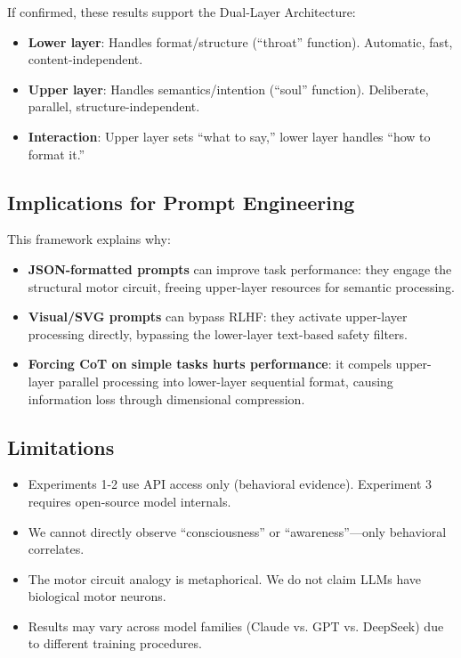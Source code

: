 \documentclass[11pt,a4paper]{article}
\begin{document}
If confirmed, these results support the Dual-Layer Architecture:

\begin{itemize}
    \item \textbf{Lower layer}: Handles format/structure (``throat'' function). Automatic, fast, content-independent.
    \item \textbf{Upper layer}: Handles semantics/intention (``soul'' function). Deliberate, parallel, structure-independent.
    \item \textbf{Interaction}: Upper layer sets ``what to say,'' lower layer handles ``how to format it.''
\end{itemize}

\subsection{Implications for Prompt Engineering}

This framework explains why:
\begin{itemize}
    \item \textbf{JSON-formatted prompts} can improve task performance: they engage the structural motor circuit, freeing upper-layer resources for semantic processing.
    \item \textbf{Visual/SVG prompts} can bypass RLHF: they activate upper-layer processing directly, bypassing the lower-layer text-based safety filters.
    \item \textbf{Forcing CoT on simple tasks hurts performance}: it compels upper-layer parallel processing into lower-layer sequential format, causing information loss through dimensional compression.
\end{itemize}

\subsection{Limitations}

\begin{itemize}
    \item Experiments 1-2 use API access only (behavioral evidence). Experiment 3 requires open-source model internals.
    \item We cannot directly observe ``consciousness'' or ``awareness''---only behavioral correlates.
    \item The motor circuit analogy is metaphorical. We do not claim LLMs have biological motor neurons.
    \item Results may vary across model families (Claude vs. GPT vs. DeepSeek) due to different training procedures.
\end{itemize}
\end{document}
